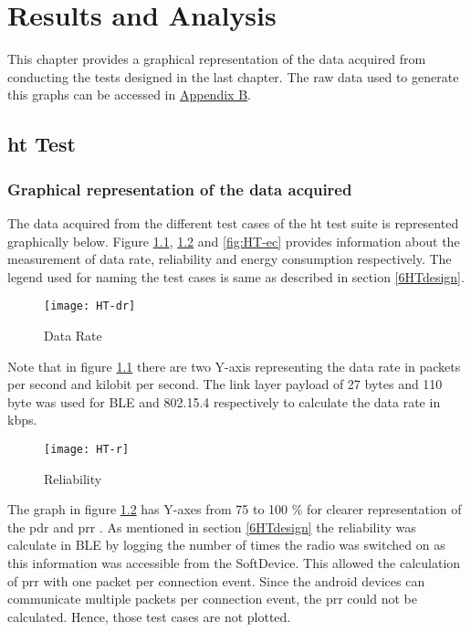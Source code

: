 \chapter{Results and Analysis}
This chapter provides a graphical representation of the data acquired from conducting the tests designed in the last chapter. The raw data used to generate this graphs can be accessed in \hyperref[AppendixB]{Appendix B}. 

\section{\acrlong{ht} Test}
\subsection{Graphical representation of the data acquired}
The data acquired from the different test cases of the \gls{ht} test suite is represented graphically below. Figure \ref{fig:HT-dr}, \ref{fig:HT-r} and \ref{fig:HT-ec} provides information about the measurement of data rate, reliability and energy consumption respectively. The legend used for naming the test cases is same as described in section \ref{6HTdesign}.

\begin{figure}[h]
\texttt{[image: HT-dr]}
\caption{Data Rate}
\label{fig:HT-dr}
\end{figure}

Note that in figure \ref{fig:HT-dr} there are two Y-axis representing the data rate in packets per second and kilobit per second. The link layer payload of 27 bytes and 110 byte was used for BLE and 802.15.4 respectively to calculate the data rate in kbps.

\begin{figure}[h]
\texttt{[image: HT-r]}
\caption{Reliability}
\label{fig:HT-r}
\end{figure}
The graph in figure \ref{fig:HT-r} has Y-axes from 75 to 100 \% for clearer representation of the \gls{pdr} and \gls{prr} . As mentioned in section \ref{6HTdesign} the reliability was calculate in BLE by logging the number of times the radio was switched on as this information was accessible from the SoftDevice. This allowed the calculation of \gls{prr} with one packet per connection event. Since the android devices can communicate multiple packets per connection event, the \gls{prr} could not be calculated. Hence, those test cases are not plotted.

